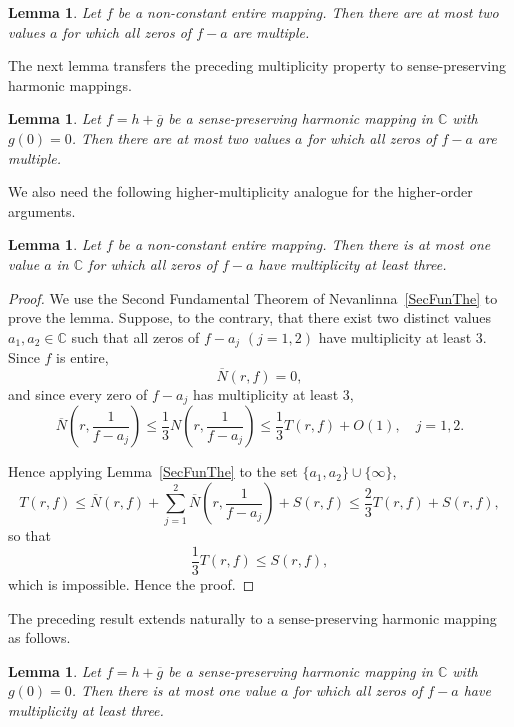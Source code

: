 \documentclass[10pt,a4paper]{amsart}
\numberwithin{equation}{section}
\newtheorem{lemma}[definition]{Lemma}
\begin{document}
\begin{lemma}\cite[Lemma 2.6]{charakbharti}
Let $f$ be a non-constant entire mapping. Then there are at most two
values $a$ for which all zeros of $f-a$ are multiple.
\end{lemma}

The next lemma transfers the preceding multiplicity property to
sense-preserving harmonic mappings.

\begin{lemma}\label{threevaluelemma}\cite[Lemma 2.7]{charakbharti}
Let $f=h+\overline{g}$ be a sense-preserving harmonic mapping in
$\mathbb{C}$ with $g(0)=0$. Then there are at most two values $a$
for which all zeros of $f-a$ are multiple.
\end{lemma}

We also need the following higher-multiplicity analogue for the 
higher-order arguments.
\begin{lemma}\label{twovaluelemma}
  Let $f$ be a non-constant entire mapping. Then there is at most 
  one value $a$ in $\mathbb{C}$ for which all zeros of $f-a$ have 
  multiplicity at least three.
\end{lemma}

\begin{proof}
We use the Second Fundamental Theorem of 
Nevanlinna~\ref{SecFunThe} to prove the lemma. Suppose, to the
contrary, that there exist two distinct values
$a_1, a_2\in\mathbb{C}$ such that all zeros of
$f-a_j$ $(j=1,2)$ have multiplicity at least $3$. Since $f$ is
entire,
\[
\overline{N}(r,f)=0,
\]
and since every zero of $f-a_j$ has multiplicity at least 3,
\[
\overline{N}\!\left(r,\frac{1}{f-a_j}\right)
\leq
\frac{1}{3}
N\!\left(r,\frac{1}{f-a_j}\right)
\leq
\frac{1}{3}T(r,f)+O(1), \quad j=1,2.
\]

Hence applying Lemma~\ref{SecFunThe} to the set 
$\{a_1,a_2\}\cup\{\infty\}$,
\[
T(r,f)
\leq
\overline{N}(r,f)
+\sum_{j=1}^{2}
\overline{N}\!\left(r,\frac{1}{f-a_j}\right)
+S(r,f)
\leq
\frac{2}{3}T(r,f)+S(r,f),
\]
so that
\[
\frac{1}{3}T(r,f)\leq S(r,f),
\]
which is impossible. Hence the proof.
\end{proof}

The preceding result extends naturally to a
sense-preserving harmonic mapping as follows.
\begin{lemma}\label{twovalueharmonic}
  Let $f=h+\overline{g}$ be a sense-preserving harmonic mapping in
$\mathbb{C}$ with $g(0)=0$. Then there is at most one value $a$
for which all zeros of $f-a$ have multiplicity at least three.
\end{lemma}
\end{document}
